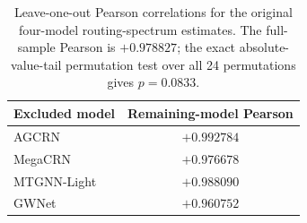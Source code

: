 \begin{table}[h]
\centering
\small
\caption{Leave-one-out Pearson correlations for the original four-model
routing-spectrum estimates. The full-sample Pearson is $+0.978827$; the exact
absolute-value-tail permutation test over all 24 permutations gives $p=0.0833$.}
\label{tab:routing_loo}
\begin{tabular}{lc}
\toprule
\textbf{Excluded model} & \textbf{Remaining-model Pearson} \\
\midrule
AGCRN & $+0.992784$ \\
MegaCRN & $+0.976678$ \\
MTGNN-Light & $+0.988090$ \\
GWNet & $+0.960752$ \\
\bottomrule
\end{tabular}
\end{table}
